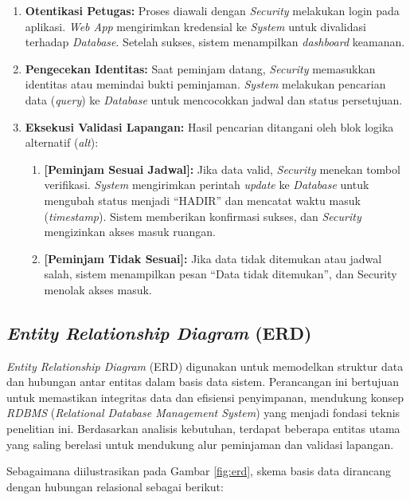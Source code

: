 \begin{enumerate}
    \item \textbf{Otentikasi Petugas:} Proses diawali dengan \textit{Security} melakukan login pada aplikasi. \textit{Web App} mengirimkan kredensial ke \textit{System} untuk divalidasi terhadap \textit{Database}. Setelah sukses, sistem menampilkan \textit{dashboard} keamanan.
    \item \textbf{Pengecekan Identitas:} Saat peminjam datang, \textit{Security} memasukkan identitas atau memindai bukti peminjaman. \textit{System} melakukan pencarian data (\textit{query}) ke \textit{Database} untuk mencocokkan jadwal dan status persetujuan.
    \item \textbf{Eksekusi Validasi Lapangan:} Hasil pencarian ditangani oleh blok logika alternatif (\textit{alt}):
    \begin{enumerate}
        \item \textbf{[Peminjam Sesuai Jadwal]:} Jika data valid, \textit{Security} menekan tombol verifikasi. \textit{System} mengirimkan perintah \textit{update} ke \textit{Database} untuk mengubah status menjadi ``HADIR'' dan mencatat waktu masuk (\textit{timestamp}). Sistem memberikan konfirmasi sukses, dan \textit{Security} mengizinkan akses masuk ruangan.
        \item \textbf{[Peminjam Tidak Sesuai]:} Jika data tidak ditemukan atau jadwal salah, sistem menampilkan pesan ``Data tidak ditemukan'', dan Security menolak akses masuk.
    \end{enumerate}
\end{enumerate}



\subsection{\textit{Entity Relationship Diagram} (ERD)}
\textit{Entity Relationship Diagram} (ERD) digunakan untuk memodelkan struktur data dan hubungan antar entitas dalam basis data sistem. Perancangan ini bertujuan untuk memastikan integritas data dan efisiensi penyimpanan, mendukung konsep \textit{RDBMS} (\textit{Relational Database Management System}) yang menjadi fondasi teknis penelitian ini. Berdasarkan analisis kebutuhan, terdapat beberapa entitas utama yang saling berelasi untuk mendukung alur peminjaman dan validasi lapangan.

Sebagaimana diilustrasikan pada Gambar \ref{fig:erd}, skema basis data dirancang dengan hubungan relasional sebagai berikut:

